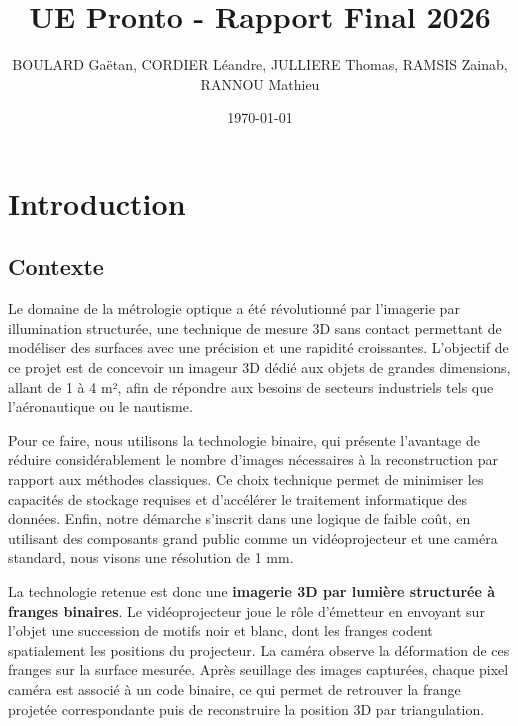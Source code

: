 \documentclass[10pt]{article} %
\begin{document}
\author{BOULARD Gaëtan, CORDIER Léandre, JULLIERE Thomas, RAMSIS Zainab, \\ RANNOU Mathieu}
\imtaAuthorShort{}
\date{\noexpand\today} %
\title{UE Pronto - Rapport Final 2026}




\imtaMaketitlepage
\newpage

\tableofcontents


\newpage

\section{Introduction}

\subsection{Contexte}

Le domaine de la métrologie optique a été révolutionné par l'imagerie par illumination structurée, une technique de mesure 3D sans contact permettant de modéliser des surfaces avec une précision et une rapidité croissantes. L'objectif de ce projet est de concevoir un imageur 3D dédié aux objets de grandes dimensions, allant de 1 à 4 m², afin de répondre aux besoins de secteurs industriels tels que l'aéronautique ou le nautisme.

Pour ce faire, nous utilisons la technologie binaire, qui présente l'avantage de réduire considérablement le nombre d'images nécessaires à la reconstruction par rapport aux méthodes classiques. Ce choix technique permet de minimiser les capacités de stockage requises et d'accélérer le traitement informatique des données. Enfin, notre démarche s'inscrit dans une logique de faible coût, en utilisant des composants grand public comme un vidéoprojecteur et une caméra standard, nous visons une résolution de 1 mm.

La technologie retenue est donc une \textbf{imagerie 3D par lumière structurée à franges binaires}. Le vidéoprojecteur joue le rôle d'émetteur en envoyant sur l'objet une succession de motifs noir et blanc, dont les franges codent spatialement les positions du projecteur. La caméra observe la déformation de ces franges sur la surface mesurée. Après seuillage des images capturées, chaque pixel caméra est associé à un code binaire, ce qui permet de retrouver la frange projetée correspondante puis de reconstruire la position 3D par triangulation.
\end{document}
